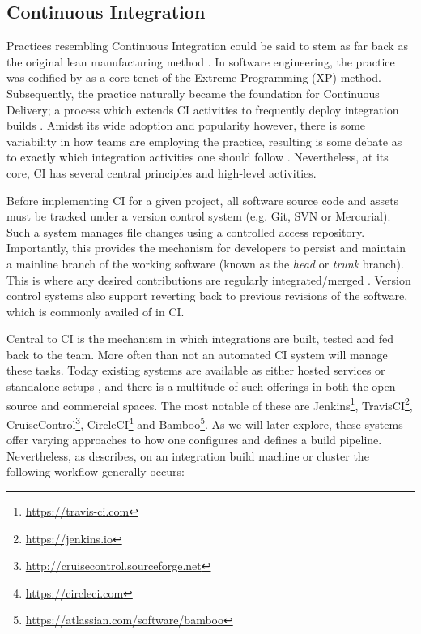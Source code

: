 \documentclass[journal]{IEEEtran}
\begin{document}
\subsection{Continuous Integration}
Practices resembling Continuous Integration could be said
to stem as far back as the original lean manufacturing method \citep{Fitz}. 
In software engineering, the practice was codified by \citet{Beck} 
as a core tenet of the Extreme Programming (XP) method.
Subsequently, the practice naturally became the foundation for Continuous
Delivery; a process which extends CI activities to frequently deploy integration builds \citep{Jez}.
Amidst its wide adoption and popularity however, 
there is some variability in how teams are employing the practice, resulting 
is some debate as to exactly which integration activities one should follow \citep{Stahl}.
Nevertheless, at its core, CI has several central principles and high-level activities.
\par
Before implementing CI for a given project, all software source code
and assets must be tracked under a version control system (e.g. Git, SVN or Mercurial).
Such a system manages file changes using a controlled access repository. Importantly,
this provides the mechanism for developers to persist and maintain a mainline branch of the working software 
(known as the \textit{head} or \textit{trunk} branch). This is where any desired contributions are regularly 
integrated/merged \citep{Vas}. Version control systems also support reverting back to
previous revisions of the software, which is commonly availed of in CI. 
\par
Central to CI is the mechanism in which integrations are built, tested and fed back to the team. 
More often than not an automated CI system will manage these tasks. Today existing systems
are available as either hosted services or standalone setups \citep{Gous}, and there is
a multitude of such offerings in both the open-source and commercial spaces. 
The most notable of these are Jenkins\footnote{\href{https://travis-ci.com}{https://travis-ci.com}}, 
TravisCI\footnote{\href{https://jenkins.io}{https://jenkins.io}}, 
CruiseControl\footnote{\href{http://cruisecontrol.sourceforge.net}{http://cruisecontrol.sourceforge.net}}, 
CircleCI\footnote{\href{https://circleci.com}{https://circleci.com}} and 
Bamboo\footnote{\href{https://www.atlassian.com/software/bamboo}{https://atlassian.com/software/bamboo}}. 
As we will later explore, these systems offer varying approaches to how one configures and
defines a build pipeline. Nevertheless, as \citet{Duvall} describes, on an integration build machine or cluster the following workflow generally occurs:
\end{document}
